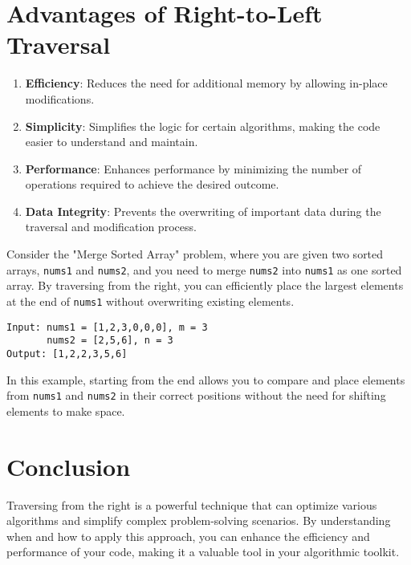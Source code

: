 \section*{Advantages of Right-to-Left Traversal}

\begin{enumerate}
    \item \textbf{Efficiency}: Reduces the need for additional memory by allowing in-place modifications.
    \item \textbf{Simplicity}: Simplifies the logic for certain algorithms, making the code easier to understand and maintain.
    \item \textbf{Performance}: Enhances performance by minimizing the number of operations required to achieve the desired outcome.
    \item \textbf{Data Integrity}: Prevents the overwriting of important data during the traversal and modification process.
\end{enumerate}


Consider the "Merge Sorted Array" problem, where you are given two sorted arrays, \texttt{nums1} and \texttt{nums2}, and you need to merge \texttt{nums2} into \texttt{nums1} as one sorted array. By traversing from the right, you can efficiently place the largest elements at the end of \texttt{nums1} without overwriting existing elements.

\begin{verbatim}
Input: nums1 = [1,2,3,0,0,0], m = 3
       nums2 = [2,5,6], n = 3
Output: [1,2,2,3,5,6]
\end{verbatim}

In this example, starting from the end allows you to compare and place elements from \texttt{nums1} and \texttt{nums2} in their correct positions without the need for shifting elements to make space.

\section*{Conclusion}

Traversing from the right is a powerful technique that can optimize various algorithms and simplify complex problem-solving scenarios. By understanding when and how to apply this approach, you can enhance the efficiency and performance of your code, making it a valuable tool in your algorithmic toolkit.